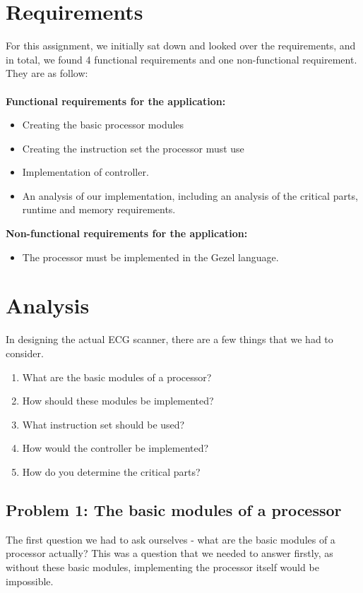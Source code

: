 \documentclass[12pt,a4paper]{article}
\begin{document}
\section{Requirements}
For this assignment, we initially sat down and looked over the requirements, and in total, we found 4 functional requirements and one non-functional requirement. They are as follow: \\
\\
\textbf{ Functional requirements for the application:}
\begin{itemize}
	\item Creating the basic processor modules
	\item Creating the instruction set the processor must use
	\item Implementation of controller.
	\item An analysis of our implementation, including an analysis of the critical parts, runtime and memory requirements.
\end{itemize}
\textbf{Non-functional requirements for the application:}
\begin {itemize}
	\item The processor must be implemented in the Gezel language.
\end{itemize}

\section{Analysis}
 	In designing the actual ECG scanner, there are a few things that we had to consider.
\begin{enumerate}
	\item What are the basic modules of a processor?
	\item How should these modules be implemented?
	\item What instruction set should be used?
	\item How would the controller be implemented?
	\item How do you determine the critical parts?
\end{enumerate}

\subsection{Problem 1: The basic modules of a processor}
The first question we had to ask ourselves - what are the basic modules of a processor actually? This was a question that we needed to answer firstly, as without these basic modules, implementing the processor itself would be impossible.
\end{document}
